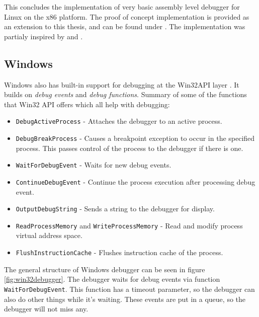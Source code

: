 This concludes the implementation of very basic assembly level debugger for
Linux on the x86 platform. The proof of concept implementation is provided as
an extension to this thesis, and can be found under . The implementation was partialy inspired by \cite{linux-debugger-blog} and \cite{lldb}.


\subsection{Windows}
Windows also has built-in support for debugging at the Win32API layer
\cite{windows-msdn-debugging-api, windows-press-debugging-api}.
It builds on \textit{debug events} and \textit{debug functions}. Summary of
some of the functions that Win32 API offers which all help with debugging:

\begin{itemize}
    \item \texttt{DebugActiveProcess} - Attaches the debugger to an active process.
    \item \texttt{DebugBreakProcess} - Causes a breakpoint exception to occur in the specified process.
                                          This passes control of the process to the debugger if there is one.
    \item \texttt{WaitForDebugEvent} - Waits for new debug events.
    \item \texttt{ContinueDebugEvent} - Continue the process execution after processing debug event.
    \item \texttt{OutputDebugString} - Sends a string to the debugger for display.
    \item \texttt{ReadProcessMemory} and \texttt{WriteProcessMemory} - Read and modify
          process virtual address space.
    \item \texttt{FlushInstructionCache} - Flushes instruction cache of the process.
\end{itemize}

The general structure of Windows debugger can be seen in figure \ref{fig:win32debugger}.
The debugger waits for debug events via function \texttt{WaitForDebugEvent}.
This function has a timeout parameter, so the debugger can also do other things while it's waiting.
These events are put in a queue, so the debugger will not miss any.

